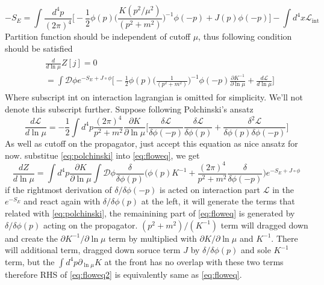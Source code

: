 \documentclass[12pt,halfline,a4paper]{ouparticle}
\begin{document}
\begin{equation}
	-S_E=\int \frac{d^4p}{(2\pi)^4}\big[-\frac{1}{2}\phi(p)\bigg(\frac{K(p^2/\mu^2)}{(p^2+m^2)}\bigg)^{-1}\phi(-p)+J(p)\phi(-p)\big]-\int d^4x \mathcal L_\text{int}
\end{equation}
Partition function should be independent of cutoff $\mu$, thus following condition should be satisfied
\begin{align}\begin{split}
	\label{eq:floweq}
	&\frac{d}{d\ln\mu}Z[j]=0\\
	&=\int\mathcal D \phi e^{-S_E+J\circ\phi}\bigg[-\frac{1}{2}\phi(p)\bigg(\frac{1}{(p^2+m^2)}\bigg)^{-1}\phi(-p)\frac{\partial K^{-1}}{\partial\ln \mu}+\frac{d \mathcal L}{d\ln \mu}\bigg]
\end{split}\end{align}
Where subscript int on interaction lagrangian is omitted for simplicity. We'll not denote this subscript further. Suppose following Polchinski's ansatz
\begin{equation}
	\label{eq:polchinski}
	\frac{d\mathcal L}{d\ln\mu}=-\frac{1}{2}\int d^4p\frac{(2\pi)^4}{p^2+m^2}\frac{\partial K}{\partial \ln\mu}\bigg[\frac{\delta \mathcal L}{\delta \phi(-p)}\frac{\delta \mathcal L}{\delta \phi(p)}+\frac{\delta^2 \mathcal L}{\delta \phi(p)\delta \phi(-p)}\bigg]
\end{equation}
As well as cutoff on the propagator, just accept this equation as nice ansatz for now. substitue \ref{eq:polchinski} into \ref{eq:floweq}, we get
\begin{equation}
	\label{eq:floweq2}
	\frac{dZ}{d\ln \mu} = \int d^4p \frac{\partial K}{\partial\ln \mu}\int \mathcal D \phi\frac{\delta}{\delta \phi(p)}\bigg(\phi(p)K^{-1}+\frac{(2\pi)^4}{p^2+m^2}\frac{\delta}{\delta\phi(-p)}\bigg)e^{-S_E+J\circ\phi}
\end{equation}
if the rightmost derivation of $\delta/\delta\phi(-p)$ is acted on interaction part $\mathcal L$ in the $e^{-S_E}$ and react again with $\delta/\delta\phi(p)$ at the left, it will generate the terms that related with \ref{eq:polchinski},
the remainining part of \ref{eq:floweq} is generated by $\delta/\delta\phi(p)$ acting on the propagator. $(p^2+m^2)/(K^{-1})$ term will dragged down and create the $\partial K^{-1}/\partial \ln \mu$ term by multiplied with $\partial K/\partial \ln \mu$ and $K^{-1}$.
There will additional term, dragged down soruce term $J$ by $\delta/\delta\phi(p)$ and sole $K^{-1}$ term, but the $\int d^4p \partial_{\ln \mu} K$ at the front has no overlap with these two terms therefore RHS of \ref{eq:floweq2} is equivalently same as \ref{eq:floweq}.
\end{document}
